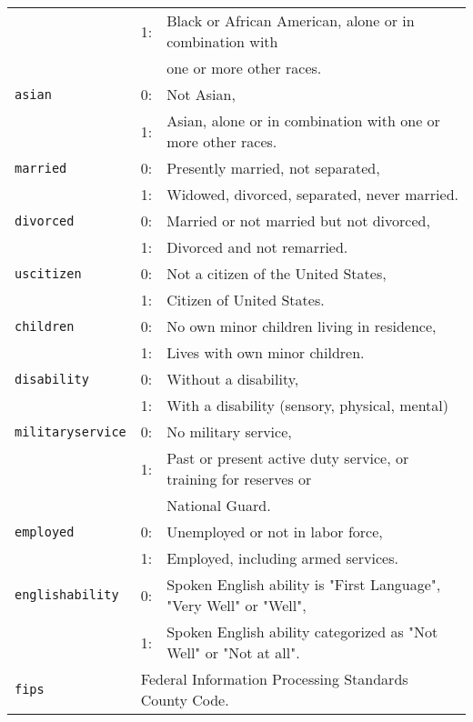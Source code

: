 \documentclass[11pt]{article}
\begin{document}
\begin{tabular}{lll}
               & 1: & Black or African American, alone or in combination with\\ && one or more other races.\\
\texttt{asian} & 0: & Not Asian,\\
               & 1: & Asian, alone or in combination with one or more other races.\\
\texttt{married} & 0: & Presently married, not separated,\\
                         & 1: & Widowed, divorced, separated, never married.\\
\texttt{divorced} & 0: & Married or not married but not divorced,\\
                         & 1: & Divorced and not remarried.\\
\texttt{uscitizen} & 0: & Not a citizen of the United States,\\
                   & 1: & Citizen of United States.\\
\texttt{children} & 0: & No own minor children living in residence,\\
                         & 1: & Lives with own minor children.\\     
\texttt{disability} & 0: & Without a disability,\\
                         & 1:& With a disability (sensory, physical, mental)\\
\texttt{militaryservice} & 0: & No military service,\\
                         & 1: & Past or present active duty service, or training for reserves or \\ && National Guard. \\
\texttt{employed} & 0: & Unemployed or not in labor force,\\
                         & 1: & Employed, including armed services.\\
\texttt{englishability} & 0: & Spoken English ability is "First Language", "Very Well" or "Well",\\
                         & 1: & Spoken English ability categorized as "Not Well" or "Not at all".\\
\texttt{fips} & \multicolumn{2}{l}{Federal Information Processing Standards County Code.} \\
\end{tabular}
\end{document}
